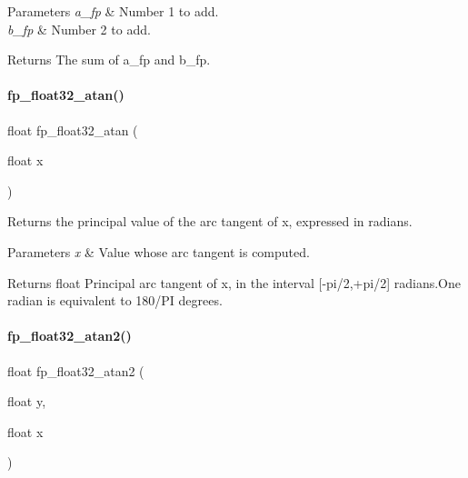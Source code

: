 \begin{DoxyParams}{Parameters}
{\em a\+\_\+fp} & Number 1 to add. \\
\hline
{\em b\+\_\+fp} & Number 2 to add. \\
\hline
\end{DoxyParams}
\begin{DoxyReturn}{Returns}
The sum of a\+\_\+fp and b\+\_\+fp. 
\end{DoxyReturn}
\mbox{\label{a00023_afff3776b0834631c841e3799f545f7a0}} 
\paragraph{\texorpdfstring{fp\+\_\+float32\+\_\+atan()}{fp\_float32\_atan()}}
{\footnotesize\ttfamily float fp\+\_\+float32\+\_\+atan (\begin{DoxyParamCaption}\item[{float}]{x }\end{DoxyParamCaption})}



Returns the principal value of the arc tangent of x, expressed in radians. 


\begin{DoxyParams}{Parameters}
{\em x} & Value whose arc tangent is computed. \\
\hline
\end{DoxyParams}
\begin{DoxyReturn}{Returns}
float Principal arc tangent of x, in the interval \mbox{[}-\/pi/2,+pi/2\mbox{]} radians.\+One radian is equivalent to 180/\+PI degrees. 
\end{DoxyReturn}
\mbox{\label{a00023_aa7b8601248d31c15f917e4d8f4f6e9d9}} 
\paragraph{\texorpdfstring{fp\+\_\+float32\+\_\+atan2()}{fp\_float32\_atan2()}}
{\footnotesize\ttfamily float fp\+\_\+float32\+\_\+atan2 (\begin{DoxyParamCaption}\item[{float}]{y,  }\item[{float}]{x }\end{DoxyParamCaption})}



